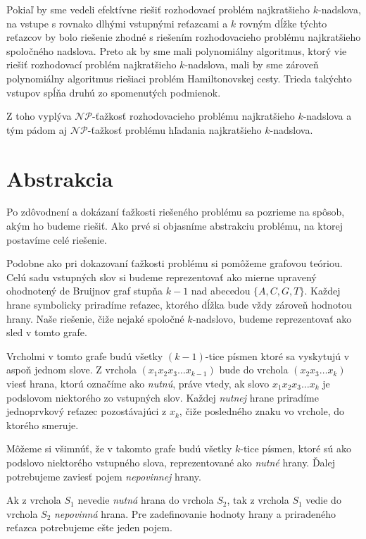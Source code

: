 Pokiaľ by sme vedeli efektívne riešiť rozhodovací problém najkratšieho $k$-nadslova,
na vstupe s rovnako dlhými vstupnými reťazcami a $k$ rovným dĺžke týchto reťazcov by
bolo riešenie zhodné s riešením rozhodovacieho problému najkratšieho spoločného nadslova.
Preto ak by sme mali polynomiálny algoritmus, ktorý vie riešiť rozhodovací problém
najkratšieho $k$-nadslova, mali by sme zároveň polynomiálny algoritmus riešiaci problém
Hamiltonovskej cesty. Trieda takýchto vstupov spĺňa druhú zo spomenutých podmienok.

Z toho vyplýva $\mathcal{NP}$-ťažkosť rozhodovacieho problému
najkratšieho $k$-nadslova a tým pádom aj $\mathcal{NP}$-ťažkosť problému hľadania
najkratšieho $k$-nadslova.

\section{Abstrakcia}

Po zdôvodnení a dokázaní ťažkosti riešeného problému sa pozrieme na spôsob, akým ho budeme
riešiť. Ako prvé si objasníme abstrakciu problému, na ktorej postavíme celé riešenie.

Podobne ako pri dokazovaní ťažkosti problému si pomôžeme grafovou teóriou. Celú
sadu vstupných slov si budeme reprezentovať ako mierne upravený ohodnotený de Bruijnov graf stupňa $k - 1$ nad
abecedou $\{A, C, G, T\}$. Každej hrane symbolicky priradíme reťazec, ktorého dĺžka bude
vždy zároveň hodnotou hrany.
Naše riešenie, čiže nejaké spoločné $k$-nadslovo, budeme reprezentovať ako sled v tomto grafe.

Vrcholmi v tomto grafe budú všetky $(k - 1)$-tice písmen ktoré sa vyskytujú v aspoň jednom slove.
Z vrchola $\left(x_1 x_2 x_3 \ldots x_{k-1}\right)$ bude do vrchola $\left(x_2 x_3 \ldots x_k\right)$
viesť hrana, ktorú označíme ako \emph{nutnú},
práve vtedy, ak slovo $x_1 x_2 x_3 \ldots x_k$ je podslovom niektorého zo
vstupných slov. Každej \emph{nutnej} hrane priradíme jednoprvkový reťazec pozostávajúci z $x_k$, čiže
posledného znaku vo vrchole, do ktorého smeruje.

Môžeme si všimnúť, že v takomto grafe budú všetky $k$-tice písmen, ktoré sú
ako podslovo niektorého vstupného slova, reprezentované ako \emph{nutné} hrany. Ďalej
potrebujeme zaviesť pojem \emph{nepovinnej} hrany.

Ak z vrchola $S_1$ nevedie \emph{nutná} hrana do vrchola $S_2$, tak z vrchola
$S_1$ vedie do vrchola $S_2$ \emph{nepovinná} hrana. Pre zadefinovanie hodnoty
hrany a priradeného reťazca potrebujeme ešte jeden pojem.


